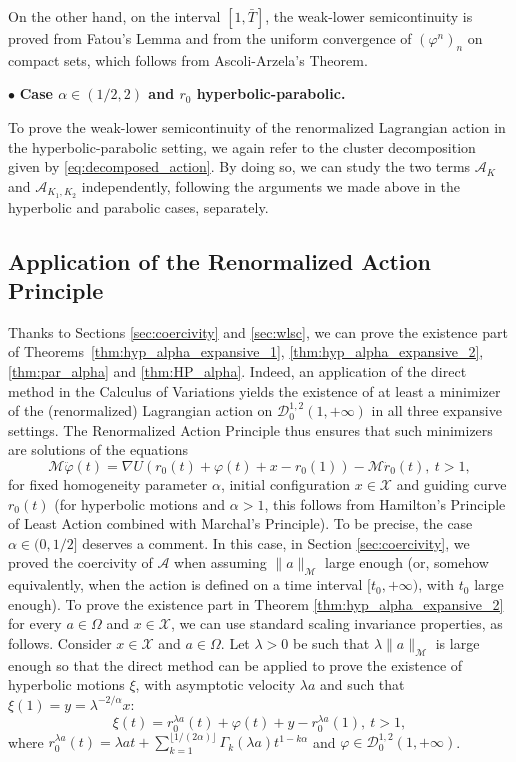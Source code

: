 \documentclass[a4paper,10pt]{amsart}
\theoremstyle{plain}
\theoremstyle{definition}
\numberwithin{equation}{section}
\numberwithin{thm}{section}
\begin{document}
On the other hand, on the interval $[1,\bar T]$, the weak-lower semicontinuity is proved from Fatou's Lemma and from the uniform convergence of $(\varphi^n)_n$ on compact sets, which follows from Ascoli-Arzela's Theorem.

\noindent $\bullet$ {\bf Case $\alpha \in (1/2,2)$ and $r_0$ hyperbolic-parabolic. }

To prove the weak-lower semicontinuity of the renormalized Lagrangian action in the hyperbolic-parabolic setting, we again refer to the cluster decomposition given by \eqref{eq:decomposed_action}. By doing so, we can study the two terms $\mathcal{A}_{K}$ and $\mathcal{A}_{K_1,K_2}$ independently, following the arguments we made above in the hyperbolic and parabolic cases, separately.





\subsection{Application of the Renormalized Action Principle}
\label{s:app}

Thanks to Sections \ref{sec:coercivity} and \ref{sec:wlsc}, we can prove the existence part of Theorems~\ref{thm:hyp_alpha_expansive_1},  \ref{thm:hyp_alpha_expansive_2}, \ref{thm:par_alpha} and \ref{thm:HP_alpha}. Indeed, an application of the direct method in the Calculus of Variations yields the existence of at least a minimizer of the (renormalized) Lagrangian action on $\mathcal{D}_0^{1,2}(1,+\infty)$ in all three expansive settings. The Renormalized Action Principle thus ensures that such minimizers are solutions of the equations
\[
\mathcal{M}\ddot{\varphi}(t) = \nabla U (r_0(t) + \varphi(t) + x - r_0(1)) - \mathcal{M}\ddot{r}_0(t), \ t>1,
\]
for fixed homogeneity parameter $\alpha$, initial configuration $x\in\mathcal{X}$ and guiding curve $r_0(t)$ (for hyperbolic motions and $\alpha>1$, this follows from Hamilton's Principle of Least Action combined with Marchal's Principle). To be precise, the case $\alpha\in (0,1/2]$ deserves a comment. In this case, in Section \ref{sec:coercivity}, we proved the coercivity of $\mathcal{A}$ when assuming $\|a\|_{\mathcal M}$ large enough (or, somehow equivalently, when the action is defined on a time interval $[t_0,+\infty)$, with $t_0$ large enough). To prove the existence part in Theorem \ref{thm:hyp_alpha_expansive_2} for every $a\in \Omega$ and $x \in \mathcal X$, we can use standard scaling invariance properties, as follows. Consider $x \in \mathcal{X}$ and $a \in \Omega$. Let $\lambda>0$ be such that $\lambda \|a\|_{\mathcal{M}}$ is large enough so that the direct method can be applied to prove the existence of hyperbolic motions $\xi$, with asymptotic velocity $\lambda a$ and such that $\xi(1)=y=\lambda^{-2/\alpha} x$:
\[
\xi(t)=r_0^{\lambda a}(t)+\varphi(t)+y-r_0^{\lambda a}(1), \ t>1,
\]
where $r_0^{\lambda a}(t)=\lambda a t+ \sum_{k=1}^{\lfloor1/(2\alpha)\rfloor}\Gamma_k(\lambda a) t^{1-k\alpha}$ and $\varphi \in \mathcal{D}^{1,2}_0(1,+\infty)$.
\end{document}

